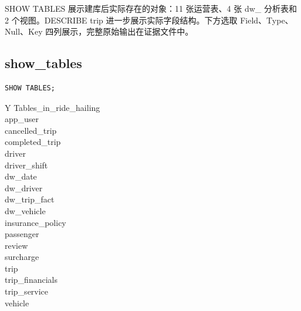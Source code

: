\documentclass[11pt,a4paper]{article}
\renewcommand{\arraystretch}{1.3}
\begin{document}
SHOW TABLES 展示建库后实际存在的对象：11 张运营表、4 张 dw\_\allowbreak{} 分析表和 2 个视图。DESCRIBE trip 进一步展示实际字段结构。下方选取 Field、Type、Null、Key 四列展示，完整原始输出在证据文件中。

\noindent\begin{minipage}[t]{.29\linewidth}\vspace{0pt}\par\noindent\begin{minipage}{\linewidth}\setlength{\parskip}{0pt}\renewcommand{\arraystretch}{1.08}\titlespacing*{\subsection}{0pt}{7pt}{4pt}\lstset{aboveskip=4pt,belowskip=4pt}
\subsection*{show\_\allowbreak{}tables}
\begin{lstlisting}
SHOW TABLES;
\end{lstlisting}
\par\begingroup\small\noindent
\begin{tabularx}{\linewidth}{Y}
\toprule
Tables\_\allowbreak{}in\_\allowbreak{}ride\_\allowbreak{}hailing\\\midrule
app\_\allowbreak{}user\\
cancelled\_\allowbreak{}trip\\
completed\_\allowbreak{}trip\\
driver\\
driver\_\allowbreak{}shift\\
dw\_\allowbreak{}date\\
dw\_\allowbreak{}driver\\
dw\_\allowbreak{}trip\_\allowbreak{}fact\\
dw\_\allowbreak{}vehicle\\
insurance\_\allowbreak{}policy\\
passenger\\
review\\
surcharge\\
trip\\
trip\_\allowbreak{}financials\\
trip\_\allowbreak{}service\\
vehicle\\
\bottomrule
\end{tabularx}
\par\endgroup
\end{minipage}\par\vspace{5pt}
\end{minipage}\hfill\begin{minipage}[t]{.68\linewidth}\vspace{0pt}\par\noindent\begin{minipage}{\linewidth}\setlength{\parskip}{0pt}\renewcommand{\arraystretch}{1.08}\titlespacing*{\subsection}{0pt}{7pt}{4pt}\lstset{aboveskip=4pt,belowskip=4pt}

\end{minipage}
\end{minipage}
\end{document}
